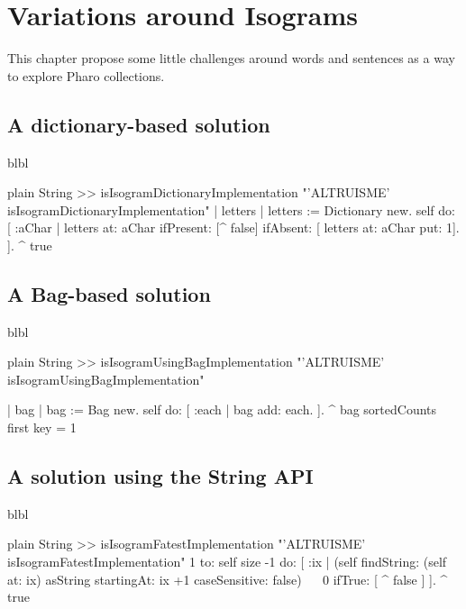 \documentclass[10pt,twoside,english]{_support/latex/sbabook/sbabook}
\begin{document}
\frontmatter
\pagestyle{plain}

\tableofcontents*
\clearpage\listoffigures

\mainmatter

\chapter{Variations around Isograms}
This chapter propose some little challenges around words and sentences as a way to explore Pharo collections.
\section{A dictionary-based solution}
\begin{todo}
blbl
\end{todo}

\begin{displaycode}{plain}
String >> isIsogramDictionaryImplementation
	"'ALTRUISME' isIsogramDictionaryImplementation"
	| letters |
	letters := Dictionary new. 
	self do: [ :aChar |
			letters at: aChar 
				ifPresent: [^ false] 
				ifAbsent: [ letters at: aChar put: 1]. 
			].
	^ true
\end{displaycode}
\section{A Bag-based solution}
\begin{todo}
blbl
\end{todo}

\begin{displaycode}{plain}
String >> isIsogramUsingBagImplementation
	"'ALTRUISME' isIsogramUsingBagImplementation"
	
	| bag |
	bag := Bag new. 
	self do: [ :each |
			bag add: each. 
			].
	^ bag sortedCounts first key = 1
\end{displaycode}
\section{A solution using the String API}
\begin{todo}
blbl
\end{todo}

\begin{displaycode}{plain}
String >> isIsogramFatestImplementation
	"'ALTRUISME' isIsogramFatestImplementation"
	1 to: self size -1 do: [ :ix |
	(self  
		findString: (self at: ix) asString
		startingAt: ix +1
		caseSensitive: false) ~~ 0 ifTrue: [ ^ false ]
	].
	^ true
\end{displaycode}
\end{document}
